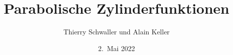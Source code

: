 %
%
%


\beamertemplatenavigationsymbolsempty
\title[ParZyl]{Parabolische Zylinderfunktionen}
\author[T.~S.~und~A.~K.]{Thierry Schwaller und Alain Keller}
\date[]{2.~Mai 2022}

